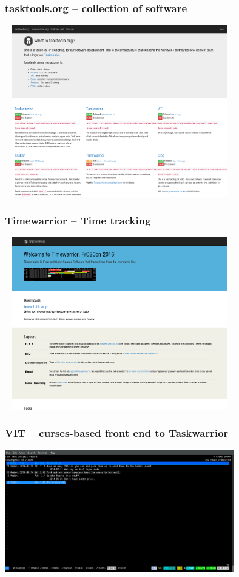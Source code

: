 \documentclass[t,handout]{beamer}
\begin{document}
\begin{frame}\frametitle{tasktools.org -- collection of software}
    \begin{center}
        \href{http://tasktools.org/}{\includegraphics[width=10cm,height=7.5cm]{tasktools-org.png}}
    \end{center}
\end{frame}

\begin{frame}\frametitle{Timewarrior -- Time tracking}
    \begin{center}
        \href{http://timewarrior.net/}{\includegraphics[width=10cm,height=7.5cm]{timewarrior.png}}
    \end{center}
\end{frame}

\begin{frame}\frametitle{VIT -- curses-based front end to Taskwarrior}
    \vfill
    \begin{center}
        \href{http://tasktools.org/projects/vit.html}{\includegraphics[width=10cm]{vit-screenshot.png}}
    \end{center}
\end{frame}
\end{document}
